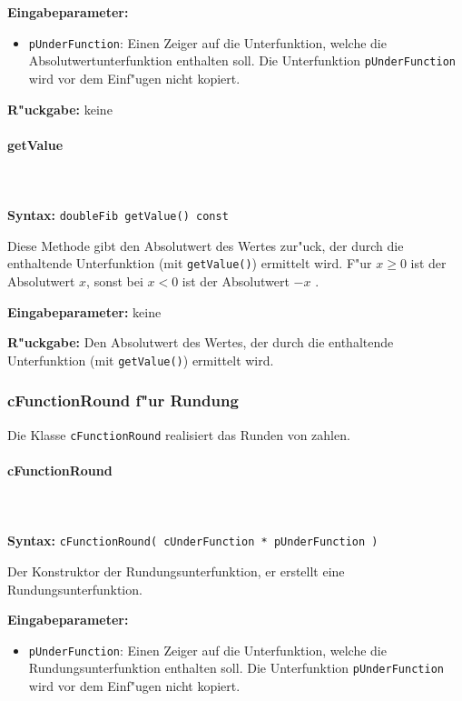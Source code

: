 \bigskip\noindent
\textbf{Eingabeparameter:}
\begin{itemize}
 \item \verb|pUnderFunction|: Einen Zeiger auf die Unterfunktion, welche die Absolutwertunterfunktion enthalten soll. Die Unterfunktion \verb|pUnderFunction| wird vor dem Einf"ugen nicht kopiert.
\end{itemize}

\bigskip\noindent
\textbf{R"uckgabe:} keine


\paragraph{getValue}

\ \\\\\noindent
\textbf{Syntax:} \verb|doubleFib getValue() const|

\bigskip\noindent
Diese Methode gibt den Absolutwert des Wertes zur"uck, der durch die enthaltende Unterfunktion (mit \verb|getValue()|) ermittelt wird. F"ur $x \geq 0$ ist der Absolutwert $x$, sonst bei $x < 0$ ist der Absolutwert $-x$ .

\bigskip\noindent
\textbf{Eingabeparameter:} keine

\bigskip\noindent
\textbf{R"uckgabe:} Den Absolutwert des Wertes, der durch die enthaltende Unterfunktion (mit \verb|getValue()|) ermittelt wird.



\subsubsection{cFunctionRound f"ur Rundung}

Die Klasse \verb|cFunctionRound| realisiert das Runden von zahlen.

\paragraph{cFunctionRound}

\ \\\\\noindent
\textbf{Syntax:} \verb|cFunctionRound( cUnderFunction * pUnderFunction )|

\bigskip\noindent
Der Konstruktor der Rundungsunterfunktion, er erstellt eine Rundungsunterfunktion.

\bigskip\noindent
\textbf{Eingabeparameter:}
\begin{itemize}
 \item \verb|pUnderFunction|: Einen Zeiger auf die Unterfunktion, welche die Rundungsunterfunktion enthalten soll. Die Unterfunktion \verb|pUnderFunction| wird vor dem Einf"ugen nicht kopiert.
\end{itemize}

